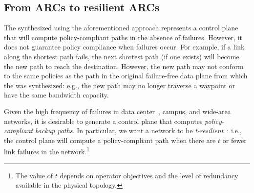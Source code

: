 \subsection{From ARCs to resilient ARCs} \label{sec:phase3}

%

The \ARC synthesized using the aforementioned approach represents a control
plane that will compute policy-compliant paths in the absence of failures.
However, it does not guarantee policy compliance when failures occur. For
example, if a link along the shortest path fails, the next shortest path (if
one exists) will become the new path to reach the destination. However, the
new path may not conform to the same policies as the path in the original
failure-free data plane from which the \ARC was synthesized: e.g., the new
path may no longer traverse a waypoint or have the same bandwidth capacity.

Given the high frequency of failures in data center~\cite{datacenterfailures},
campus, and wide-area~\cite{turner10:sigcomm} networks, it is desirable to
generate a control plane that computes {\em policy-compliant backup paths}.
In particular, we want a network to be {\em t-resilient}~\cite{plinko}: i.e.,
the control plane will compute a policy-compliant path when there are $t$ or
fewer link failures in the network.\footnote{The value of $t$ depends on
operator objectives and the level of redundancy available in the physical
topology.} 


